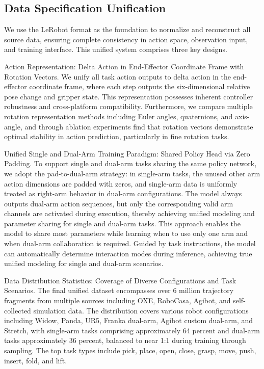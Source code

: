 \documentclass[11pt,a4paper]{article}
\begin{document}
\subsection{Data Specification Unification}

We use the LeRobot format as the foundation to normalize and reconstruct all source data, ensuring complete consistency in action space, observation input, and training interface. This unified system comprises three key designs.

Action Representation: Delta Action in End-Effector Coordinate Frame with Rotation Vectors. We unify all task action outputs to delta action in the end-effector coordinate frame, where each step outputs the six-dimensional relative pose change and gripper state. This representation possesses inherent controller robustness and cross-platform compatibility. Furthermore, we compare multiple rotation representation methods including Euler angles, quaternions, and axis-angle, and through ablation experiments find that rotation vectors demonstrate optimal stability in action prediction, particularly in fine rotation tasks.

Unified Single and Dual-Arm Training Paradigm: Shared Policy Head via Zero Padding. To support single and dual-arm tasks sharing the same policy network, we adopt the pad-to-dual-arm strategy: in single-arm tasks, the unused other arm action dimensions are padded with zeros, and single-arm data is uniformly treated as right-arm behavior in dual-arm configurations. The model always outputs dual-arm action sequences, but only the corresponding valid arm channels are activated during execution, thereby achieving unified modeling and parameter sharing for single and dual-arm tasks. This approach enables the model to share most parameters while learning when to use only one arm and when dual-arm collaboration is required. Guided by task instructions, the model can automatically determine interaction modes during inference, achieving true unified modeling for single and dual-arm scenarios.

Data Distribution Statistics: Coverage of Diverse Configurations and Task Scenarios. The final unified dataset encompasses over 6 million trajectory fragments from multiple sources including OXE, RoboCasa, Agibot, and self-collected simulation data. The distribution covers various robot configurations including Widow, Panda, UR5, Franka dual-arm, Agibot custom dual-arm, and Stretch, with single-arm tasks comprising approximately 64 percent and dual-arm tasks approximately 36 percent, balanced to near 1:1 during training through sampling. The top task types include pick, place, open, close, grasp, move, push, insert, fold, and lift.
\end{document}
